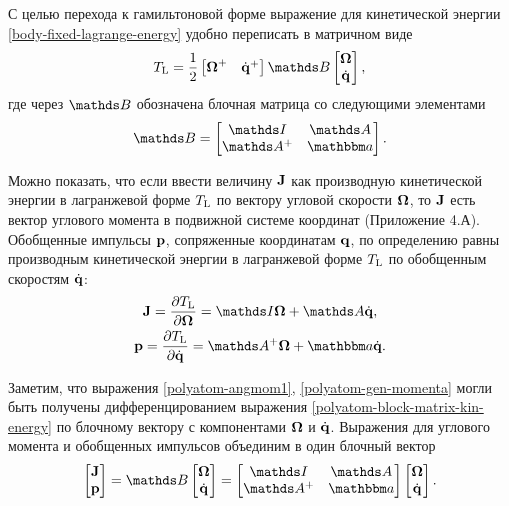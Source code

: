 С целью перехода к гамильтоновой форме выражение для кинетической энергии \eqref{body-fixed-lagrange-energy} удобно переписать в матричном виде
\begin{gather}
    \Tl = \frac{1}{2} \begin{bmatrix} \bOmega^+ & \dot{\mf{q}}^+ \end{bmatrix} \bbB \begin{bmatrix} \bOmega \\ \dot{\mf{q}} \end{bmatrix}, \label{polyatom-block-matrix-kin-energy}
\end{gather}
%
где через $\bbB$ обозначена блочная матрица со следующими элементами 
\begin{gather}
    \bbB = \begin{bmatrix} 
    \bbI & \bbA \\ \bbA^+ & \bba 
    \end{bmatrix}.
\end{gather}

Можно показать, что если ввести величину $\mathbf{J}$ как производную кинетической энергии в лагранжевой форме $T_\text{L}$ по вектору угловой скорости $\boldsymbol{\Omega}$, то $\mathbf{J}$ есть вектор углового момента в подвижной системе координат (Приложение 4.А). Обобщенные импульсы $\mathbf{p}$, сопряженные координатам $\mathbf{q}$, по определению равны производным кинетической энергии в лагранжевой форме $T_\text{L}$ по обобщенным скоростям $\dot{\mathbf{q}}$: 
\begin{gather}
    \mf{J} = \frac{\partial \Tl}{\partial \bOmega} = \bbI \bOmega + \bbA \dot{\mf{q}}, \label{polyatom-angmom1} \\
\mf{p} = \frac{\partial \Tl}{\partial \dot{\mf{q}}} = \bbA^+ \bOmega + \bba \dot{\mf{q}} \label{polyatom-gen-momenta}.
\end{gather}

Заметим, что выражения \eqref{polyatom-angmom1}, \eqref{polyatom-gen-momenta} могли быть получены дифференцированием выражения  \eqref{polyatom-block-matrix-kin-energy} по блочному вектору с компонентами $\boldsymbol{\Omega}$ и $\dot{\mathbf{q}}$. Выражения для углового момента и обобщенных импульсов объединим в один блочный вектор
\begin{gather}
    \begin{bmatrix} \mf{J} \\ \mf{p} \end{bmatrix} = \bbB \begin{bmatrix} \bOmega \\ \dot{\mf{q}} \end{bmatrix} = 
    \begin{bmatrix} \bbI & \bbA \\ \bbA^+ & \bba \end{bmatrix} \begin{bmatrix} \bOmega \\ \dot{\mf{q}} \end{bmatrix}.
\end{gather}

